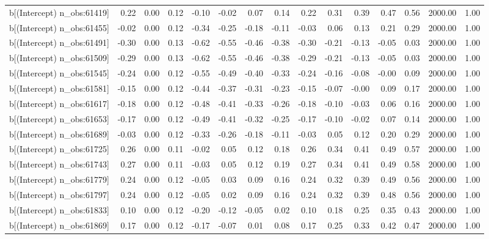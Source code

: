 \begin{table}[ht]
\begin{tabular}{rrrrrrrrrrrrrrr}
  b[(Intercept) n\_obs:61419] & 0.22 & 0.00 & 0.12 & -0.10 & -0.02 & 0.07 & 0.14 & 0.22 & 0.31 & 0.39 & 0.47 & 0.56 & 2000.00 & 1.00 \\ 
  b[(Intercept) n\_obs:61455] & -0.02 & 0.00 & 0.12 & -0.34 & -0.25 & -0.18 & -0.11 & -0.03 & 0.06 & 0.13 & 0.21 & 0.29 & 2000.00 & 1.00 \\ 
  b[(Intercept) n\_obs:61491] & -0.30 & 0.00 & 0.13 & -0.62 & -0.55 & -0.46 & -0.38 & -0.30 & -0.21 & -0.13 & -0.05 & 0.03 & 2000.00 & 1.00 \\ 
  b[(Intercept) n\_obs:61509] & -0.29 & 0.00 & 0.13 & -0.62 & -0.55 & -0.46 & -0.38 & -0.29 & -0.21 & -0.13 & -0.05 & 0.03 & 2000.00 & 1.00 \\ 
  b[(Intercept) n\_obs:61545] & -0.24 & 0.00 & 0.12 & -0.55 & -0.49 & -0.40 & -0.33 & -0.24 & -0.16 & -0.08 & -0.00 & 0.09 & 2000.00 & 1.00 \\ 
  b[(Intercept) n\_obs:61581] & -0.15 & 0.00 & 0.12 & -0.44 & -0.37 & -0.31 & -0.23 & -0.15 & -0.07 & -0.00 & 0.09 & 0.17 & 2000.00 & 1.00 \\ 
  b[(Intercept) n\_obs:61617] & -0.18 & 0.00 & 0.12 & -0.48 & -0.41 & -0.33 & -0.26 & -0.18 & -0.10 & -0.03 & 0.06 & 0.16 & 2000.00 & 1.00 \\ 
  b[(Intercept) n\_obs:61653] & -0.17 & 0.00 & 0.12 & -0.49 & -0.41 & -0.32 & -0.25 & -0.17 & -0.10 & -0.02 & 0.07 & 0.14 & 2000.00 & 1.00 \\ 
  b[(Intercept) n\_obs:61689] & -0.03 & 0.00 & 0.12 & -0.33 & -0.26 & -0.18 & -0.11 & -0.03 & 0.05 & 0.12 & 0.20 & 0.29 & 2000.00 & 1.00 \\ 
  b[(Intercept) n\_obs:61725] & 0.26 & 0.00 & 0.11 & -0.02 & 0.05 & 0.12 & 0.18 & 0.26 & 0.34 & 0.41 & 0.49 & 0.57 & 2000.00 & 1.00 \\ 
  b[(Intercept) n\_obs:61743] & 0.27 & 0.00 & 0.11 & -0.03 & 0.05 & 0.12 & 0.19 & 0.27 & 0.34 & 0.41 & 0.49 & 0.58 & 2000.00 & 1.00 \\ 
  b[(Intercept) n\_obs:61779] & 0.24 & 0.00 & 0.12 & -0.05 & 0.03 & 0.09 & 0.16 & 0.24 & 0.32 & 0.39 & 0.49 & 0.56 & 2000.00 & 1.00 \\ 
  b[(Intercept) n\_obs:61797] & 0.24 & 0.00 & 0.12 & -0.05 & 0.02 & 0.09 & 0.16 & 0.24 & 0.32 & 0.39 & 0.48 & 0.56 & 2000.00 & 1.00 \\ 
  b[(Intercept) n\_obs:61833] & 0.10 & 0.00 & 0.12 & -0.20 & -0.12 & -0.05 & 0.02 & 0.10 & 0.18 & 0.25 & 0.35 & 0.43 & 2000.00 & 1.00 \\ 
  b[(Intercept) n\_obs:61869] & 0.17 & 0.00 & 0.12 & -0.17 & -0.07 & 0.01 & 0.08 & 0.17 & 0.25 & 0.33 & 0.42 & 0.47 & 2000.00 & 1.00 \\ 

\end{tabular}
\end{table}
